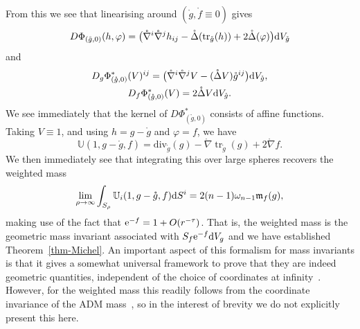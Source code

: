 \documentclass[10pt,a4paper]{amsart}
\numberwithin{equation}{section}
\theoremstyle{definition}
\begin{document}
From this we see that linearising around $(\mathring g, \mathring f\equiv0)$ gives
\begin{equation*}
	D\Phi_{(\mathring g,0)}(h,\varphi)=\bigl( 	\mathring{\nabla}^i \mathring{\nabla}^j h_{ij} - \mathring{\Delta}(\operatorname{tr}_{\mathring g}(h)) +2\mathring{\Delta}(\varphi)\bigr){\rm d}V_{\mathring g}
\end{equation*}
and
\begin{gather*}
		D_g\Phi_{(\mathring g,0)}^*(V)^{ij}=   \bigl(\mathring{\nabla}^i \mathring{\nabla}^j V - (\mathring{\Delta} V)  \mathring g^{ij}\bigr){\rm d}V_{\mathring g},\\
		D_f\Phi_{(\mathring g,0)}^*(V)=   2 \mathring{\Delta} V {\rm d}V_{\mathring g}.
\end{gather*}
We see immediately that the kernel of $D\Phi^*_{(\mathring g,0)}$ consists of affine functions. Taking $V\equiv 1$, and using $h=g-\mathring g$ and $\varphi=f$, we have
\[
	\mathbb U(1,g-\mathring g,f)=\mathrm{div}_{\mathring g}(g)-\mathring{\nabla}\operatorname{tr}_{\mathring g}(g)+2\mathring{\nabla} f.
\]
We then immediately see that integrating this over large spheres recovers the weighted mass
\begin{equation*}
	\lim_{\rho\to\infty}\int_{S_\rho}\mathbb U_i(1,g-\mathring g,f){\rm d}S^i=2(n-1)\omega_{n-1}\mathfrak{m}_f(g),
\end{equation*}
making use of the fact that ${\rm e}^{-f}=1+O(r^{-\tau})$. That is, the weighted mass is the geometric mass invariant associated with $S_f{\rm e}^{-f}{\rm d}V_g$ and we have established Theorem~\ref{thm-Michel}. An important aspect of this formalism for mass invariants is that it gives a somewhat universal framework to prove that they are indeed geometric quantities, independent of the choice of coordinates at infinity~\cite{Michel11}. However, for the weighted mass this readily follows from the coordinate invariance of the ADM mass~\cite{BaldaufOzuch22,LawLopezSantiago24}, so in the interest of brevity we do not explicitly present this here.
\end{document}
